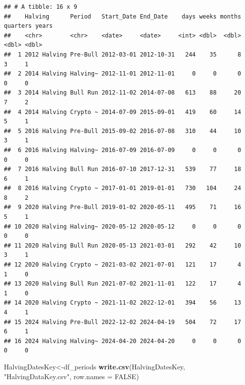 \documentclass[
]{article}
\newenvironment{Shaded}{\begin{snugshade}}{\end{snugshade}}
\newcommand{\AttributeTok}[1]{\textcolor[rgb]{0.13,0.29,0.53}{#1}}
\newcommand{\ConstantTok}[1]{\textcolor[rgb]{0.56,0.35,0.01}{#1}}
\newcommand{\FunctionTok}[1]{\textcolor[rgb]{0.13,0.29,0.53}{\textbf{#1}}}
\newcommand{\NormalTok}[1]{#1}
\newcommand{\OtherTok}[1]{\textcolor[rgb]{0.56,0.35,0.01}{#1}}
\newcommand{\StringTok}[1]{\textcolor[rgb]{0.31,0.60,0.02}{#1}}
\begin{document}
\begin{verbatim}
## # A tibble: 16 x 9
##    Halving      Period   Start_Date End_Date    days weeks months quarters years
##    <chr>        <chr>    <date>     <date>     <int> <dbl>  <dbl>    <dbl> <dbl>
##  1 2012 Halving Pre-Bull 2012-03-01 2012-10-31   244    35      8        3     1
##  2 2014 Halving Halving~ 2012-11-01 2012-11-01     0     0      0        0     0
##  3 2014 Halving Bull Run 2012-11-02 2014-07-08   613    88     20        7     2
##  4 2014 Halving Crypto ~ 2014-07-09 2015-09-01   419    60     14        5     1
##  5 2016 Halving Pre-Bull 2015-09-02 2016-07-08   310    44     10        3     1
##  6 2016 Halving Halving~ 2016-07-09 2016-07-09     0     0      0        0     0
##  7 2016 Halving Bull Run 2016-07-10 2017-12-31   539    77     18        6     1
##  8 2016 Halving Crypto ~ 2017-01-01 2019-01-01   730   104     24        8     2
##  9 2020 Halving Pre-Bull 2019-01-02 2020-05-11   495    71     16        5     1
## 10 2020 Halving Halving~ 2020-05-12 2020-05-12     0     0      0        0     0
## 11 2020 Halving Bull Run 2020-05-13 2021-03-01   292    42     10        3     1
## 12 2020 Halving Crypto ~ 2021-03-02 2021-07-01   121    17      4        1     0
## 13 2020 Halving Bull Run 2021-07-02 2021-11-01   122    17      4        1     0
## 14 2020 Halving Crypto ~ 2021-11-02 2022-12-01   394    56     13        4     1
## 15 2024 Halving Pre-Bull 2022-12-02 2024-04-19   504    72     17        6     1
## 16 2024 Halving Halving~ 2024-04-20 2024-04-20     0     0      0        0     0
\end{verbatim}

\begin{Shaded}
\begin{Highlighting}[]
\NormalTok{HalvingDatesKey}\OtherTok{\textless{}{-}}\NormalTok{df\_periods}
\FunctionTok{write.csv}\NormalTok{(HalvingDatesKey, }\StringTok{"HalvingDataKey.csv"}\NormalTok{, }\AttributeTok{row.names =} \ConstantTok{FALSE}\NormalTok{)}
\end{Highlighting}
\end{Shaded}
\end{document}
